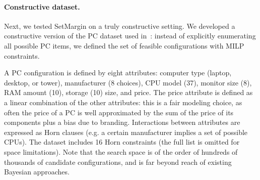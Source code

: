 \documentclass{article}
\renewcommand\[{\begin{equation}}
\renewcommand\]{\end{equation}}
\newcommand{\andrea}[1]{{\bf \textcolor{blue}{{\fbox{Andrea:} #1}}}}
\begin{document}
\paragraph{Constructive dataset.} Next, we tested {\sc SetMargin} on a truly
constructive setting. We developed a constructive version of the PC dataset
used in~\cite{guo2010real}: instead of explicitly enumerating all possible PC
items, we defined the set of feasible configurations with MILP constraints.

A PC configuration is defined by eight attributes: computer type (laptop,
desktop, or tower), manufacturer (8 choices), CPU model (37), monitor size (8), RAM amount (10), storage (10)
size, and price.
The price attribute is defined as a linear combination of the other
attributes: this is a fair modeling choice, as often the price of a PC is
well approximated by the sum of the price of its components plus a bias due to
branding.
%
Interactions between attributes are expressed as Horn clauses (e.g. a certain manufacturer implies a set of possible CPUs).
The
dataset includes 16 Horn constraints (the full list is omitted for
space limitations).
Note that the search space is of the order of hundreds of thousands of
candidate configurations, and is far beyond reach of existing Bayesian
approaches.
\end{document}

